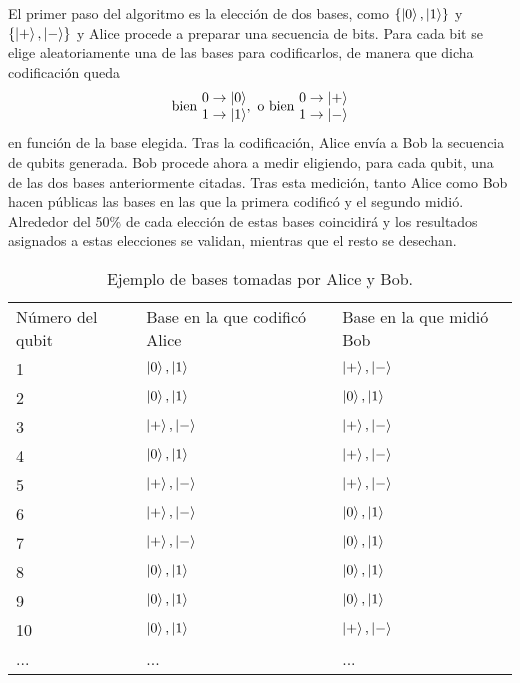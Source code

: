 El primer paso del algoritmo es la elección de dos bases, como $\{\left|0\right\rangle,\left|1\right\rangle\}$ y $\{\left|+\right\rangle,\left|-\right\rangle\}$ y Alice procede a preparar una secuencia de bits. Para cada bit se elige aleatoriamente una de las bases para codificarlos, de manera que dicha codificación queda
\[\mathrm{bien\ }\begin{matrix}0\to\ket0\\1\to\ket1\end{matrix}\mathrm{,\ o\ bien\ }\begin{matrix}0\to\ket+\\1\to\ket-\end{matrix}\] 
%
en función de la base elegida. Tras la codificación, Alice envía a Bob la secuencia de qubits generada. Bob procede ahora a medir eligiendo, para cada qubit, una de las dos bases anteriormente citadas. Tras esta medición, tanto Alice como Bob hacen públicas las bases en las que la primera codificó y el segundo midió. Alrededor del 50\% de cada elección de estas bases coincidirá y los resultados asignados a estas elecciones se validan, mientras que el resto se desechan.
\begin{table}[htb]
\begin{tabular}{lll}
\rowcolor[HTML]{FFFFC7} 
Número del qubit & Base en la que codificó Alice & Base en la que midió Bob \\ 
\rowcolor[HTML]{FD6864} 
1                                & $\left|0\right\rangle,\left|1\right\rangle$                 & $\left|+\right\rangle,\left|-\right\rangle$            \\ 
\rowcolor[HTML]{9AFF99} 
2                                & $\left|0\right\rangle,\left|1\right\rangle$                 & $\left|0\right\rangle,\left|1\right\rangle$            \\ 
\rowcolor[HTML]{9AFF99} 
3                                & $\left|+\right\rangle,\left|-\right\rangle$                 & $\left|+\right\rangle,\left|-\right\rangle$            \\ 
\rowcolor[HTML]{FD6864} 
4                                & $\left|0\right\rangle,\left|1\right\rangle$                 & $\left|+\right\rangle,\left|-\right\rangle$            \\ 
\rowcolor[HTML]{9AFF99} 
5                                & $\left|+\right\rangle,\left|-\right\rangle$                 & $\left|+\right\rangle,\left|-\right\rangle$            \\ 
\rowcolor[HTML]{FD6864} 
6                                & $\left|+\right\rangle,\left|-\right\rangle$                 & $\left|0\right\rangle,\left|1\right\rangle$            \\ 
\rowcolor[HTML]{FD6864} 
7                                & $\left|+\right\rangle,\left|-\right\rangle$                 & $\left|0\right\rangle,\left|1\right\rangle$            \\ 
\rowcolor[HTML]{9AFF99} 
8                                & $\left|0\right\rangle,\left|1\right\rangle$                 & $\left|0\right\rangle,\left|1\right\rangle$            \\ 
\rowcolor[HTML]{9AFF99} 
9                                & $\left|0\right\rangle,\left|1\right\rangle$                 & $\left|0\right\rangle,\left|1\right\rangle$            \\ 
\rowcolor[HTML]{FD6864} 
10                               & $\left|0\right\rangle,\left|1\right\rangle$                 & $\left|+\right\rangle,\left|-\right\rangle$            \\ 
\rowcolor[HTML]{FFFFC7} 
...                              & ...                           & ...                      \\ 
\end{tabular}
\caption{Ejemplo de bases tomadas por Alice y Bob.}
\label{tab:tab21}
\end{table}

